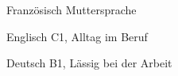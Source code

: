 

\begin{cvpairs}

  
\cvpair
    {Französisch} %
    {Muttersprache} %


\cvpair
    {Englisch} %
    {C1, Alltag im Beruf} %


\cvpair
    {Deutsch} %
    {B1, Lässig bei der Arbeit} %

\end{cvpairs}